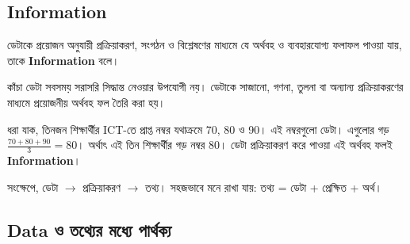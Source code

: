 \subsection{Information}

\begin{definitionbox}{}
ডেটাকে প্রয়োজন অনুযায়ী প্রক্রিয়াকরণ, সংগঠন ও বিশ্লেষণের মাধ্যমে
যে অর্থবহ ও ব্যবহারযোগ্য ফলাফল পাওয়া যায়, তাকে
\textbf{Information} বলে।
\end{definitionbox}


কাঁচা ডেটা সবসময় সরাসরি সিদ্ধান্ত নেওয়ার উপযোগী নয়। ডেটাকে
সাজানো, গণনা, তুলনা বা অন্যান্য প্রক্রিয়াকরণের মাধ্যমে প্রয়োজনীয়
অর্থবহ ফল তৈরি করা হয়।




ধরা যাক, তিনজন শিক্ষার্থীর ICT-তে প্রাপ্ত নম্বর যথাক্রমে 70, 80 ও 90। এই নম্বরগুলো ডেটা। এগুলোর গড় \(\frac{70+80+90}{3}=80\)। অর্থাৎ এই তিন শিক্ষার্থীর গড় নম্বর 80। ডেটা প্রক্রিয়াকরণ করে পাওয়া এই অর্থবহ ফলই
\textbf{Information}।

\begin{flushleft}\centering\captionsetup{justification=centering}\begin{minipage}{\linewidth}\raggedright



\end{minipage}\end{flushleft}

সংক্ষেপে, ডেটা \(\rightarrow\) প্রক্রিয়াকরণ \(\rightarrow\) তথ্য। সহজভাবে মনে রাখা যায়: তথ্য = ডেটা + প্রেক্ষিত + অর্থ।

\subsection{Data ও তথ্যের মধ্যে পার্থক্য}

